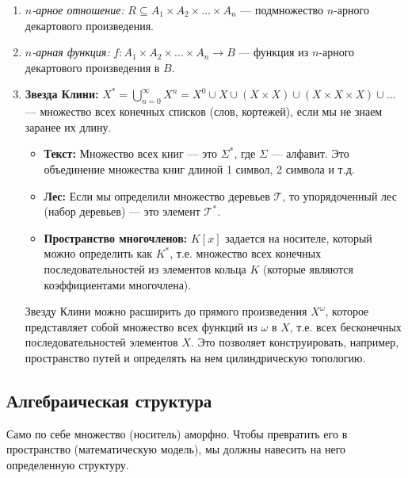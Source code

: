 \documentclass[11pt, a4paper]{extarticle}
\newcommand{\om}{\omega}
\begin{document}
\begin{definition}
\begin{enumerate}
\item \textit{$n$-арное отношение:} $R \subseteq A_1 \times A_2 \times \dots \times A_n$ --- подмножество $n$-арного декартового произведения.

\item \textit{$n$-арная функция:} $f:A_1 \times A_2 \times \dots \times A_n \to B$ --- функция из $n$-арного декартового произведения в $B$.

\item \textbf{Звезда Клини:} $X^* = \bigcup_{n=0}^{\infty} X^n = X^0 \cup X \cup (X \times X) \cup (X \times X \times X) \cup \dots$ --- множество всех конечных списков (слов, кортежей), если мы не знаем заранее их длину.

\begin{example}
\begin{itemize}
    \item \textbf{Текст:} Множество всех книг — это $\Sigma^*$, где $\Sigma$ — алфавит. Это объединение множества книг длиной 1 символ, 2 символа и т.д.
    \item \textbf{Лес:} Если мы определили множество деревьев $\mathcal{T}$, то упорядоченный лес (набор деревьев) — это элемент $\mathcal{T}^*$.
    \item \textbf{Пространство многочленов:} $K[x]$ задается на носителе, который можно определить как $K^*$, т.е. множество всех конечных последовательностей из элементов кольца $K$ (которые являются коэффициентами многочлена).
\end{itemize}
\end{example}

Звезду Клини можно расширить до прямого произведения $X^\om$, которое представляет собой множество всех функций из $\om$ в $X$, т.е. всех бесконечных последовательностей элементов $X$. Это позволяет конструировать, например, пространство путей и определять на нем цилиндрическую топологию.
\end{enumerate}
\end{definition}

\subsection{Алгебраическая структура}
Само по себе множество (носитель) аморфно. Чтобы превратить его в пространство (математическую модель), мы должны навесить на него определенную структуру.
\end{document}
